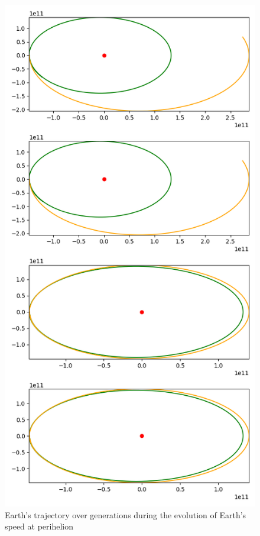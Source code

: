 \begin{figure}
    \center
    \includegraphics[scale=.3]{img/earth_speed.png}
    \caption{Earth's trajectory over generations during the evolution of
        Earth's speed at perihelion}
    \label{speed_2}
\end{figure}

